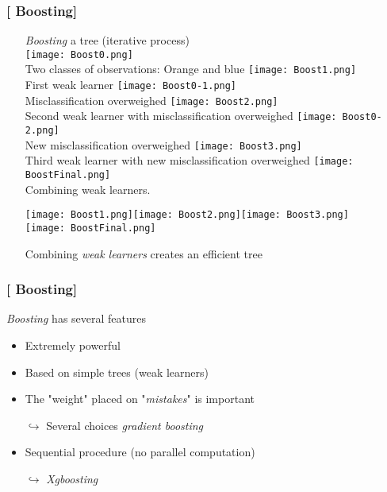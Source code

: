 \documentclass[xcolor=x11names,compress, aspectratio=169]{beamer}
\renewcommand{\(}{\begin{columns}}
\renewcommand{\)}{\end{columns}}
\newcommand{\<}[1]{\begin{column}{#1}}
\renewcommand{\>}{\end{column}}
\begin{document}
\begin{frame}
\frametitle{\textcolor{brique}{[ Boosting]}}
\pause
\begin{itemize}
\item[] \textit{Boosting} a tree (iterative process)\\
    {\texttt{[image: Boost0.png]} \\ }
    {Two classes of observations: Orange and blue}
    {\texttt{[image: Boost1.png]} \\ }
    {First weak learner}
    {\texttt{[image: Boost0-1.png]} \\ }
    {Misclassification overweighed}
    {\texttt{[image: Boost2.png]} \\ }
    {Second weak learner with misclassification overweighed}
    {\texttt{[image: Boost0-2.png]} \\ }
    {New misclassification overweighed}
    {\texttt{[image: Boost3.png]} \\ }
    {Third weak learner with new misclassification overweighed}
    {\texttt{[image: BoostFinal.png]} \\ }
    {Combining weak learners.}
    { \begin{center} \texttt{[image: Boost1.png]}\texttt{[image: Boost2.png]}\texttt{[image: Boost3.png]} \\
           \texttt{[image: BoostFinal.png]} \end{center}  }
    {Combining \textit{weak learners} creates an efficient tree}
\end{itemize}
\end{frame}

\begin{frame}
\frametitle{\textcolor{brique}{[ Boosting]}}
\textit{Boosting} has several features
\pause
 \begin{itemize}[<+->]
    \item  Extremely powerful
    \item  Based on simple trees (weak learners)
     \item The "weight" placed on "\textit{mistakes}" is important
    \item[$\hookrightarrow$] Several choices \textit{gradient boosting}
    \item Sequential procedure (no parallel computation)
    \item[$\hookrightarrow$] \textit{Xgboosting}
 \end{itemize}
\end{frame}
%
\end{document}
